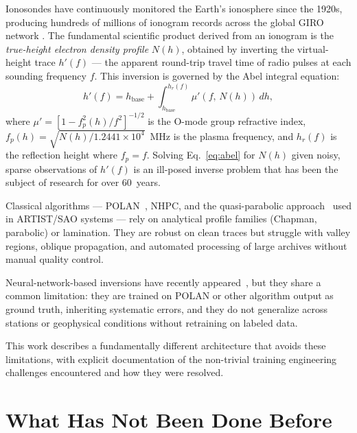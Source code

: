 \documentclass[11pt,twocolumn]{article}
\begin{document}
Ionosondes have continuously monitored the Earth's ionosphere since the 1920s,
producing hundreds of millions of ionogram records across the global GIRO network
\citep{reinisch2011}.
The fundamental scientific product derived from an ionogram is the
\emph{true-height electron density profile} $N(h)$, obtained by inverting the
virtual-height trace $h'(f)$ — the apparent round-trip travel time of radio pulses
at each sounding frequency $f$.
This inversion is governed by the Abel integral equation:
\begin{equation}
  h'(f) = h_\text{base} + \int_{h_\text{base}}^{h_r(f)}
  \mu'\!\left(f,\,N(h)\right)\,dh,
  \label{eq:abel}
\end{equation}
where $\mu' = [1 - f_p^2(h)/f^2]^{-1/2}$ is the O-mode group refractive index,
$f_p(h) = \sqrt{N(h)/1.2441\times10^4}$~MHz is the plasma frequency, and
$h_r(f)$ is the reflection height where $f_p = f$.
Solving Eq.~\eqref{eq:abel} for $N(h)$ given noisy, sparse observations of
$h'(f)$ is an ill-posed inverse problem that has been the subject of research
for over 60~years.

Classical algorithms --- POLAN~\citep{titheridge1985}, NHPC, and the
quasi-parabolic approach~\citep{reinisch1983} used in ARTIST/SAO systems ---
rely on analytical profile families (Chapman, parabolic) or lamination.
They are robust on clean traces but struggle with valley regions, oblique
propagation, and automated processing of large archives without manual
quality control.

Neural-network-based inversions have recently appeared~\citep{jiang2022,
eyfells2022}, but they share a common limitation: they are trained on POLAN or
other algorithm output as ground truth, inheriting systematic errors, and they
do not generalize across stations or geophysical conditions without retraining on
labeled data.

This work describes a fundamentally different architecture that avoids
these limitations, with explicit documentation of the non-trivial training
engineering challenges encountered and how they were resolved.

\section{What Has Not Been Done Before}
\end{document}
